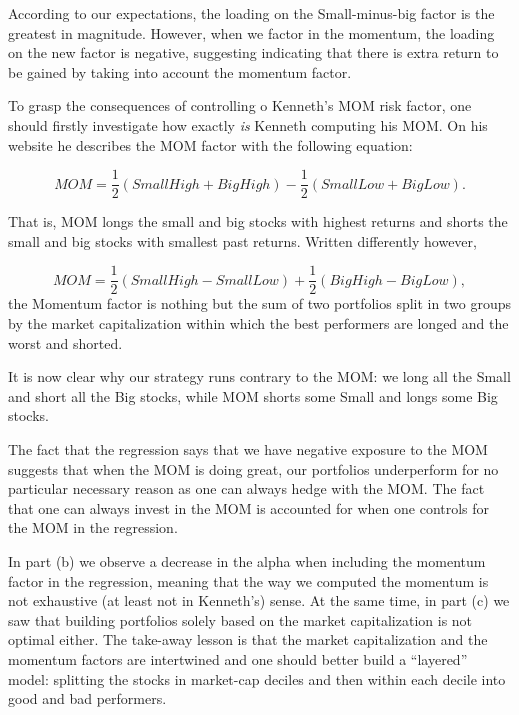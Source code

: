 \documentclass[10pt]{article}
\begin{document}
According to our expectations, the loading on the Small-minus-big factor is the
greatest in magnitude. However, when we factor in the momentum, the loading on
the new factor is negative, suggesting indicating that there is extra return to
be gained by taking into account the momentum factor.

To grasp the consequences of controlling o Kenneth's MOM risk factor, one should
firstly investigate how exactly \textit{is} Kenneth computing his MOM. On his website he
describes the MOM factor with the following equation:

\begin{equation}
  MOM = \frac{1}{2} \left( Small High + Big High \right) - \frac{1}{2}\left(
    Small Low + Big Low \right).
  \end{equation}

  That is, MOM longs the small and big stocks with highest returns and
  shorts the small and big stocks with smallest past returns. Written
  differently however,

  \begin{equation}
  MOM = \frac{1}{2} \left( Small High - Small Low \right) + \frac{1}{2}\left(
    Big High - Big Low \right),
  \end{equation}
  the Momentum factor is nothing but the sum of two portfolios split in two
  groups by the market capitalization within which the best performers are
  longed and the worst and shorted.

  It is now clear why our strategy runs contrary to the MOM: we long all the
  Small and short all the Big stocks, while MOM shorts some Small and longs some
  Big stocks.

  The fact that the regression says that we have negative exposure to the MOM
  suggests that when the MOM is doing great, our portfolios underperform for no
  particular necessary reason as one can always hedge with the MOM. The
  fact that one can always invest in the MOM is accounted for when one controls
  for the MOM in the regression.

  In part (b) we observe a decrease in the alpha when including the
  momentum factor in the regression, meaning that the way we computed the
  momentum is not exhaustive (at least not in Kenneth's) sense. At the same time,
  in part (c) we saw that building portfolios solely based on the market
  capitalization is not optimal either. The take-away lesson is that the market
  capitalization and the momentum factors are intertwined and one should better
  build a ``layered'' model: splitting the stocks in market-cap deciles and then
  within each decile into good and bad performers.

   
\end{document}
